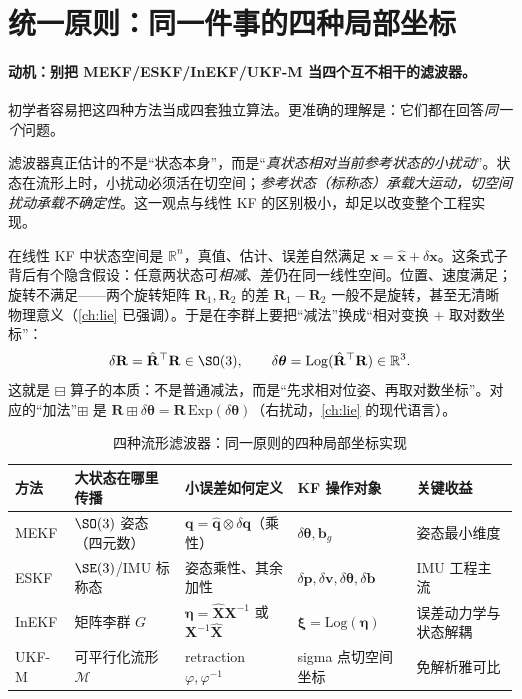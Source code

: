 \section{统一原则：同一件事的四种局部坐标}
\label{sec:family-unified}

\paragraph{动机：别把 MEKF/ESKF/InEKF/UKF-M 当四个互不相干的滤波器。}
初学者容易把这四种方法当成四套独立算法。更准确的理解是：它们都在回答\emph{同一个}问题。

\begin{insight}[流形滤波的一句话本质]
滤波器真正估计的不是“状态本身”，而是“\emph{真状态相对当前参考状态的小扰动}”。状态在流形上时，小扰动必须活在切空间；\emph{参考状态（标称态）承载大运动，切空间扰动承载不确定性}。这一观点与线性 KF 的区别极小，却足以改变整个工程实现。
\end{insight}

在线性 KF 中状态空间是 $\mathbb{R}^n$，真值、估计、误差自然满足 $\mathbf{x}=\hat{\mathbf{x}}+\delta\mathbf{x}$。这条式子背后有个隐含假设：任意两状态可\emph{相减}、差仍在同一线性空间。位置、速度满足；旋转不满足——两个旋转矩阵 $\mathbf{R}_1,\mathbf{R}_2$ 的差 $\mathbf{R}_1-\mathbf{R}_2$ 一般不是旋转，甚至无清晰物理意义（\cref{ch:lie} 已强调）。于是在李群上要把“减法”换成“相对变换 $+$ 取对数坐标”：
\begin{equation}
  \delta\mathbf{R}=\hat{\mathbf{R}}^\top\mathbf{R}\in\SO(3),\qquad
  \delta\boldsymbol{\theta}=\mathrm{Log}(\hat{\mathbf{R}}^\top\mathbf{R})\in\mathbb{R}^3.
  \label{eq:boxminus-rot}
\end{equation}
这就是 $\boxminus$ 算子的本质：不是普通减法，而是“先求相对位姿、再取对数坐标”。对应的“加法”$\boxplus$ 是 $\mathbf{R}\boxplus\delta\boldsymbol{\theta}=\mathbf{R}\,\mathrm{Exp}(\delta\boldsymbol{\theta})$（右扰动，\cref{ch:lie} 的现代语言）。

\begin{table}[H]\centering\small
\caption{四种流形滤波器：同一原则的四种局部坐标实现}
\label{tab:family-unified}
\begin{tabular}{lllll}
\toprule
方法 & 大状态在哪里传播 & 小误差如何定义 & KF 操作对象 & 关键收益 \\
\midrule
MEKF & $\SO(3)$ 姿态（四元数） & $\mathbf{q}=\hat{\mathbf{q}}\otimes\delta\mathbf{q}$（乘性） & $\delta\boldsymbol{\theta},\mathbf{b}_g$ & 姿态最小维度 \\
ESKF & $\SE(3)$/IMU 标称态 & 姿态乘性、其余加性 & $\delta\mathbf{p},\delta\mathbf{v},\delta\boldsymbol{\theta},\delta\mathbf{b}$ & IMU 工程主流 \\
InEKF & 矩阵李群 $G$ & $\boldsymbol{\eta}=\hat{\mathbf{X}}\mathbf{X}^{-1}$ 或 $\mathbf{X}^{-1}\hat{\mathbf{X}}$ & $\boldsymbol{\xi}=\mathrm{Log}(\boldsymbol{\eta})$ & 误差动力学与状态解耦 \\
UKF-M & 可平行化流形 $\mathcal{M}$ & retraction $\varphi,\varphi^{-1}$ & sigma 点切空间坐标 & 免解析雅可比 \\
\bottomrule
\end{tabular}
\end{table}

